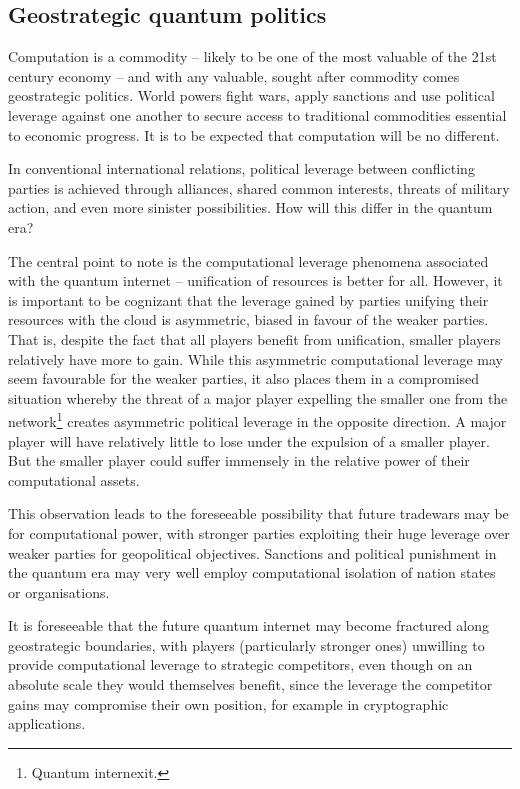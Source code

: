 \subsection{Geostrategic quantum politics}


Computation is a commodity -- likely to be one of the most valuable of the 21st century economy -- and with any valuable, sought after commodity comes geostrategic politics. World powers fight wars, apply sanctions and use political leverage against one another to secure access to traditional commodities essential to economic progress. It is to be expected that computation will be no different.

In conventional international relations, political leverage between conflicting parties is achieved through alliances, shared common interests, threats of military action, and even more sinister possibilities. How will this differ in the quantum era?

The central point to note is the computational leverage phenomena associated with the quantum internet -- unification of resources is better for all. However, it is important to be cognizant that the leverage gained by parties unifying their resources with the cloud is asymmetric, biased in favour of the weaker parties. That is, despite the fact that all players benefit from unification, smaller players relatively have more to gain. While this asymmetric computational leverage may seem favourable for the weaker parties, it also places them in a compromised situation whereby the threat of a major player expelling the smaller one from the network\footnote{Quantum internexit.} creates asymmetric political leverage in the opposite direction. A major player will have relatively little to lose under the expulsion of a smaller player. But the smaller player could suffer immensely in the relative power of their computational assets.

This observation leads to the foreseeable possibility that future tradewars may be for computational power, with stronger parties exploiting their huge leverage over weaker parties for geopolitical objectives. Sanctions and political punishment in the quantum era may very well employ computational isolation of nation states or organisations.

It is foreseeable that the future quantum internet may become fractured along geostrategic boundaries, with players (particularly stronger ones) unwilling to provide computational leverage to strategic competitors, even though on an absolute scale they would themselves benefit, since the leverage the competitor gains may compromise their own position, for example in cryptographic applications.

